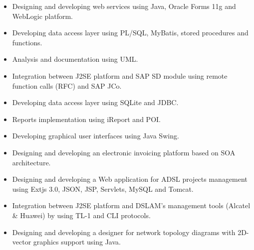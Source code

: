 \documentclass[10pt,a4paper,ragged2e]{altacv}
\begin{document}
\vspace{5px}
\divider
\vspace{5px}

\begin{itemize}
   \item Designing and developing web services using Java, Oracle Forms 11g and WebLogic platform.
   \item Developing data access layer using  PL/SQL, MyBatis, stored procedures and functions.
   \item Analysis and documentation using UML.
\end{itemize}

\vspace{5px}
\divider
\vspace{5px}

\begin{itemize}
   \item Integration between J2SE platform and SAP SD module using remote function calls (RFC) and SAP JCo.
   \item Developing data access layer using SQLite and JDBC.
   \item Reports implementation using iReport and POI.
   \item Developing graphical user interfaces using Java Swing.
   \item Designing and developing an electronic invoicing platform based on SOA architecture.
\end{itemize}

\vspace{5px}
\divider
\vspace{5px}

\begin{itemize}
   \item Designing and developing a Web application for ADSL projects management using Extjs 3.0, JSON, JSP, Servlets, MySQL and Tomcat.
   \item Integration between J2SE platform and DSLAM's management tools (Alcatel \& Huawei) by using TL-1 and CLI protocols.
   \item Designing and developing a designer for network topology diagrams with 2D-vector graphics support using Java.
\end{itemize}
\end{document}
